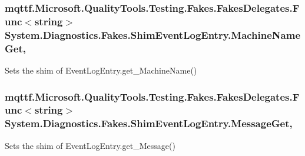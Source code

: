 \hypertarget{class_system_1_1_diagnostics_1_1_fakes_1_1_shim_event_log_entry_a31ffcaa77bc80629cccde86faf0b6fd3}{
\subsubsection[{Machine\-Name\-Get}]{\setlength{\rightskip}{0pt plus 5cm}mqttf.\-Microsoft.\-Quality\-Tools.\-Testing.\-Fakes.\-Fakes\-Delegates.\-Func$<$string$>$ System.\-Diagnostics.\-Fakes.\-Shim\-Event\-Log\-Entry.\-Machine\-Name\-Get\hspace{0.3cm}{\ttfamily [get]}, {\ttfamily [set]}}}\label{class_system_1_1_diagnostics_1_1_fakes_1_1_shim_event_log_entry_a31ffcaa77bc80629cccde86faf0b6fd3}


Sets the shim of Event\-Log\-Entry.\-get\-\_\-\-Machine\-Name()

\hypertarget{class_system_1_1_diagnostics_1_1_fakes_1_1_shim_event_log_entry_a0ace60918d50469046a33d93d870e276}{
\subsubsection[{Message\-Get}]{\setlength{\rightskip}{0pt plus 5cm}mqttf.\-Microsoft.\-Quality\-Tools.\-Testing.\-Fakes.\-Fakes\-Delegates.\-Func$<$string$>$ System.\-Diagnostics.\-Fakes.\-Shim\-Event\-Log\-Entry.\-Message\-Get\hspace{0.3cm}{\ttfamily [get]}, {\ttfamily [set]}}}\label{class_system_1_1_diagnostics_1_1_fakes_1_1_shim_event_log_entry_a0ace60918d50469046a33d93d870e276}


Sets the shim of Event\-Log\-Entry.\-get\-\_\-\-Message()

